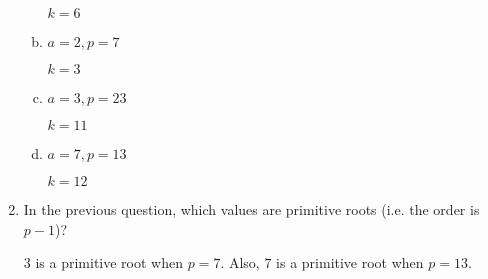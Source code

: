 \documentclass[12pt]{amsart}
\theoremstyle{plain}
\theoremstyle{definition}
\theoremstyle{remark}
\begin{document}
\begin{enumerate}[1.]
\begin{enumerate}[a.]
				\begin{framed}
				$k = 6$
				\end{framed}
			\newpage \item $a = 2, p = 7$
				\begin{framed}
				$k = 3$
				\end{framed}
			\item $a = 3, p = 23$
				\begin{framed}
				$k = 11$
				\end{framed}
			\item $a = 7, p = 13$
				\begin{framed}
				$k = 12$
				\end{framed}
		\end{enumerate}         
		\item In the previous question, which values are primitive roots (i.e. the order is $p-1$)?
			\begin{framed}
			$3$ is a primitive root when $p =  7$.  Also, $7$ is a primitive root when $p = 13$.
			\end{framed}
		

\end{enumerate}
\end{document}
